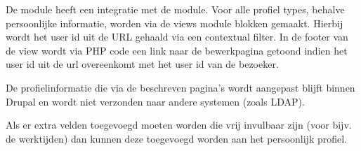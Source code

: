De  module heeft een integratie met de  module. Voor alle profiel types, behalve persoonlijke informatie, worden via de views module blokken gemaakt. Hierbij wordt het user id uit de URL gehaald via een contextual filter. In de footer van de view wordt via PHP code een link naar de bewerkpagina getoond indien het user id uit de url overeenkomt met het user id van de bezoeker.

De profielinformatie die via de beschreven pagina's wordt aangepast blijft binnen Drupal en wordt niet verzonden naar andere systemen (zoals LDAP).

Als er extra velden toegevoegd moeten worden die vrij invulbaar zijn (voor bijv. de werktijden) dan kunnen deze toegevoegd worden aan het persoonlijk profiel.
